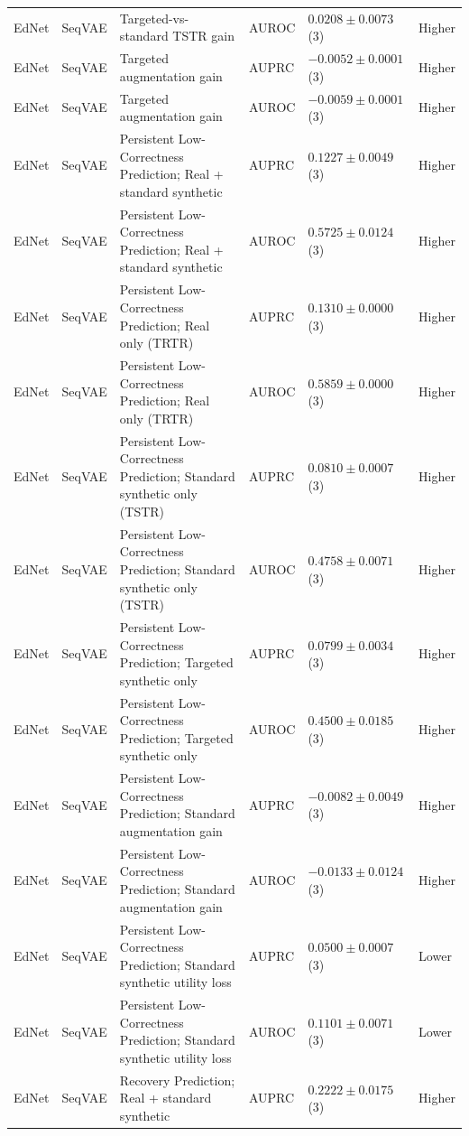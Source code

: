 \begin{longtable}{@{}p{2.25cm}p{2.05cm}p{4.7cm}p{5.0cm}p{2.6cm}p{1.25cm}@{}}
EdNet & SeqVAE & Targeted-vs-standard TSTR gain & AUROC & $0.0208 \mathbin{\pm} 0.0073$ (3) & Higher \\
EdNet & SeqVAE & Targeted augmentation gain & AUPRC & $-0.0052 \mathbin{\pm} 0.0001$ (3) & Higher \\
EdNet & SeqVAE & Targeted augmentation gain & AUROC & $-0.0059 \mathbin{\pm} 0.0001$ (3) & Higher \\
EdNet & SeqVAE & Persistent Low-Correctness Prediction; Real + standard synthetic & AUPRC & $0.1227 \mathbin{\pm} 0.0049$ (3) & Higher \\
EdNet & SeqVAE & Persistent Low-Correctness Prediction; Real + standard synthetic & AUROC & $0.5725 \mathbin{\pm} 0.0124$ (3) & Higher \\
EdNet & SeqVAE & Persistent Low-Correctness Prediction; Real only (TRTR) & AUPRC & $0.1310 \mathbin{\pm} 0.0000$ (3) & Higher \\
EdNet & SeqVAE & Persistent Low-Correctness Prediction; Real only (TRTR) & AUROC & $0.5859 \mathbin{\pm} 0.0000$ (3) & Higher \\
EdNet & SeqVAE & Persistent Low-Correctness Prediction; Standard synthetic only (TSTR) & AUPRC & $0.0810 \mathbin{\pm} 0.0007$ (3) & Higher \\
EdNet & SeqVAE & Persistent Low-Correctness Prediction; Standard synthetic only (TSTR) & AUROC & $0.4758 \mathbin{\pm} 0.0071$ (3) & Higher \\
EdNet & SeqVAE & Persistent Low-Correctness Prediction; Targeted synthetic only & AUPRC & $0.0799 \mathbin{\pm} 0.0034$ (3) & Higher \\
EdNet & SeqVAE & Persistent Low-Correctness Prediction; Targeted synthetic only & AUROC & $0.4500 \mathbin{\pm} 0.0185$ (3) & Higher \\
EdNet & SeqVAE & Persistent Low-Correctness Prediction; Standard augmentation gain & AUPRC & $-0.0082 \mathbin{\pm} 0.0049$ (3) & Higher \\
EdNet & SeqVAE & Persistent Low-Correctness Prediction; Standard augmentation gain & AUROC & $-0.0133 \mathbin{\pm} 0.0124$ (3) & Higher \\
EdNet & SeqVAE & Persistent Low-Correctness Prediction; Standard synthetic utility loss & AUPRC & $0.0500 \mathbin{\pm} 0.0007$ (3) & Lower \\
EdNet & SeqVAE & Persistent Low-Correctness Prediction; Standard synthetic utility loss & AUROC & $0.1101 \mathbin{\pm} 0.0071$ (3) & Lower \\
EdNet & SeqVAE & Recovery Prediction; Real + standard synthetic & AUPRC & $0.2222 \mathbin{\pm} 0.0175$ (3) & Higher \\

\end{longtable}
